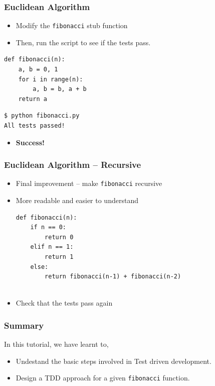 \documentclass[12pt,presentation]{beamer}
\providecommand{\alert}[1]{\textbf{#1}}
\begin{document}
\begin{frame}[fragile]
  \frametitle{Euclidean Algorithm}
  \begin{itemize}
  \item Modify the \texttt{fibonacci} stub function
  \item Then, run the script to see if the tests pass.
  \end{itemize}
\begin{lstlisting}
def fibonacci(n):
    a, b = 0, 1
    for i in range(n):
        a, b = b, a + b
    return a

\end{lstlisting}
\begin{lstlisting}
$ python fibonacci.py
All tests passed!
\end{lstlisting} %
  \begin{itemize}
  \item \alert{Success!}
  \end{itemize}
\end{frame}

\begin{frame}[fragile]
  \frametitle{Euclidean Algorithm -- Recursive}
  \begin{itemize}
  \item Final improvement -- make \texttt{fibonacci} recursive
  \item More readable and easier to understand
\begin{lstlisting}
def fibonacci(n):
    if n == 0:
        return 0
    elif n == 1:
        return 1
    else:
        return fibonacci(n-1) + fibonacci(n-2)
        
\end{lstlisting}
  \item Check that the tests pass again
  \end{itemize}
\end{frame}


\begin{frame}
\frametitle{Summary}
\label{sec-8}

  In this tutorial, we have learnt to,


\begin{itemize}
\item Undestand the basic steps involved in Test driven development.
\item Design a TDD approach for a given \texttt{fibonacci} function.

\end{itemize}
\end{frame}
\end{document}
